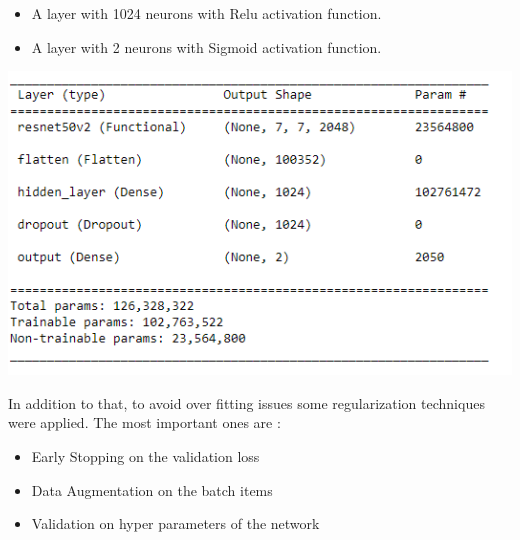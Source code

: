 \begin{flushleft}
\begin{itemize}
    \item A layer with 1024 neurons with Relu activation function.
    \item A layer with 2 neurons with Sigmoid activation function.
\end{itemize}
\begin{center}
\includegraphics[scale = 0.70]{images/ModelUsed.PNG}    
\end{center}

In addition to that, to avoid over fitting issues some regularization techniques were applied. The most important ones are :
\begin{itemize}
    \item Early Stopping on the validation loss
    \item Data Augmentation on the batch items
    \item Validation on hyper parameters of the network 
\end{itemize}




\end{flushleft}